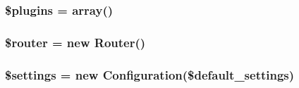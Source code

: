 \hypertarget{setup_8php_a4ab51386acb82cd0a0066eac2567b2bd}{
\subsubsection[{\$plugins}]{\setlength{\rightskip}{0pt plus 5cm}\$plugins = array()}}\label{setup_8php_a4ab51386acb82cd0a0066eac2567b2bd}
\hypertarget{setup_8php_ad77f00d881c7c3dc8bd1749c7174de92}{
\subsubsection[{\$router}]{\setlength{\rightskip}{0pt plus 5cm}\$router = new Router()}}\label{setup_8php_ad77f00d881c7c3dc8bd1749c7174de92}
\hypertarget{setup_8php_ac7c3353107070daa85f641882931b358}{
\subsubsection[{\$settings}]{\setlength{\rightskip}{0pt plus 5cm}\$settings = new Configuration(\$default\-\_\-settings)}}\label{setup_8php_ac7c3353107070daa85f641882931b358}
